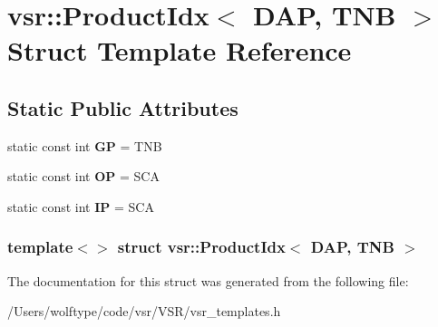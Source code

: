 \hypertarget{structvsr_1_1_product_idx_3_01_d_a_p_00_01_t_n_b_01_4}{\section{vsr\-:\-:Product\-Idx$<$ D\-A\-P, T\-N\-B $>$ Struct Template Reference}
\label{structvsr_1_1_product_idx_3_01_d_a_p_00_01_t_n_b_01_4}
}
\subsection*{Static Public Attributes}
\begin{DoxyCompactItemize}
\item 
\hypertarget{structvsr_1_1_product_idx_3_01_d_a_p_00_01_t_n_b_01_4_aaa44c700e29ae6ea1b5d231918630119}{static const int {\bfseries G\-P} = T\-N\-B}\label{structvsr_1_1_product_idx_3_01_d_a_p_00_01_t_n_b_01_4_aaa44c700e29ae6ea1b5d231918630119}

\item 
\hypertarget{structvsr_1_1_product_idx_3_01_d_a_p_00_01_t_n_b_01_4_a58d7ec78302b5d5f2916cd0ce4a8f2e0}{static const int {\bfseries O\-P} = S\-C\-A}\label{structvsr_1_1_product_idx_3_01_d_a_p_00_01_t_n_b_01_4_a58d7ec78302b5d5f2916cd0ce4a8f2e0}

\item 
\hypertarget{structvsr_1_1_product_idx_3_01_d_a_p_00_01_t_n_b_01_4_aacc910e5adb3934301715b5509baeaf5}{static const int {\bfseries I\-P} = S\-C\-A}\label{structvsr_1_1_product_idx_3_01_d_a_p_00_01_t_n_b_01_4_aacc910e5adb3934301715b5509baeaf5}

\end{DoxyCompactItemize}
\subsubsection*{template$<$$>$ struct vsr\-::\-Product\-Idx$<$ D\-A\-P, T\-N\-B $>$}



The documentation for this struct was generated from the following file\-:\begin{DoxyCompactItemize}
\item 
/\-Users/wolftype/code/vsr/\-V\-S\-R/vsr\-\_\-templates.\-h\end{DoxyCompactItemize}
